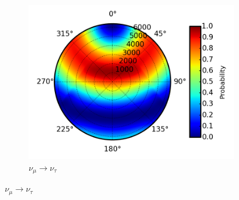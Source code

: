\documentclass{beamer}
\begin{document}
\begin{frame}
\begin{figure}
\begin{subfigure}[b]{0.33\linewidth}
			\caption{ $\nu_{\mu} \rightarrow \nu_{\tau}$ }
			\includegraphics[width=\linewidth]{earth_10.0gev_numu2nutau_throughEarth.png}
		\end{subfigure}
	\end{figure}
\end{frame}
\end{document}
